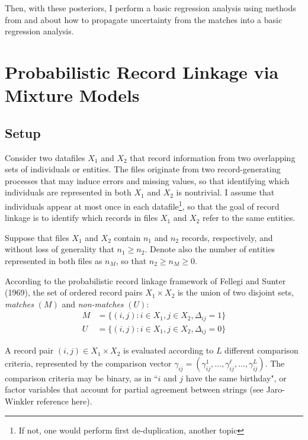 \documentclass[11pt,reqno]{amsart}
\begin{document}
Then, with these posteriors, I perform a basic regression analysis using methods from \cite{lahiri_larsen_2005} and \cite{tancredi_liseo_2015} \cite{tancredi_liseo_2011} about how to propagate uncertainty from the matches into a basic regression analysis.   

\section{Probabilistic Record Linkage via Mixture Models}

\subsection{Setup} Consider two datafiles $X_1$ and $X_2$ that record information from two overlapping sets of individuals or entities.  The files originate from two record-generating processes that may induce errors and missing values, so that identifying which individuals are represented in both $X_1$ and $X_2$ is nontrivial.  I assume that individuals appear at most once in each datafile\footnote{If not, one would perform first de-duplication, another topic}, so that the goal of record linkage is to identify which records in files $X_1$ and $X_2$ refer to the same entities.  

Suppose that files $X_1$ and $X_2$ contain $n_1$ and $n_2$ records, respectively, and without loss of generality that $n_1 \geq n_2$.  Denote also the number of entities represented in both files as $n_{M}$, so that $n_2\geq n_M \geq 0$. 

According to the probabilistic record linkage framework of Fellegi and Sunter (1969), the set of ordered record pairs $X_1 \times X_2$ is the union of two disjoint sets, \textit{matches} $(M)$ and \textit{non-matches} $(U)$:
\begin{align*} M &= \{(i,j): i\in X_1, j\in X_2, \Delta_{ij}=1\} \\ U &= \{(i,j): i\in X_1, j\in X_2, \Delta_{ij}=0\}\end{align*} 

A record pair $(i,j) \in X_1\times X_2$ is evaluated according to $L$ different comparison criteria, represented by the comparison vector $\gamma_{ij}= (\gamma_{ij}^1, \dots, \gamma_{ij}^{\ell}, \dots, \gamma_{ij}^L)$.  The comparison criteria may be binary, as in ``$i$ and $j$ have the same birthday", or factor variables that account for partial agreement between strings (see Jaro-Winkler reference here).    %
\end{document}
